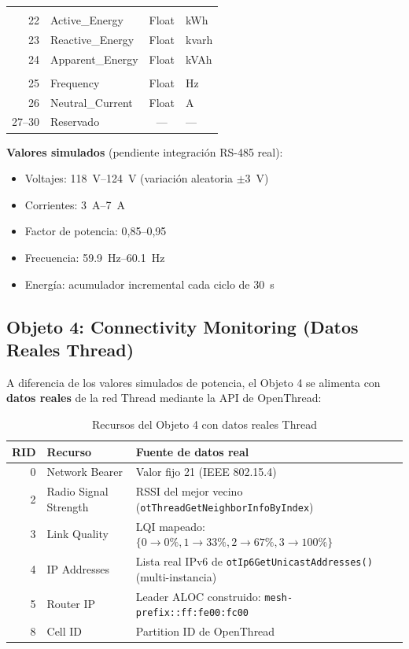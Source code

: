 \documentclass[11pt,a4paper]{article}
\begin{document}
\begin{longtable}{r l c l}
\addlinespace
\multicolumn{4}{l}{\textbf{Energía Acumulada}} \\
22 & Active\_Energy & Float & kWh \\
23 & Reactive\_Energy & Float & kvarh \\
24 & Apparent\_Energy & Float & kVAh \\
\addlinespace
\multicolumn{4}{l}{\textbf{Sistema}} \\
25 & Frequency & Float & Hz \\
26 & Neutral\_Current & Float & A \\
27--30 & Reservado & --- & --- \\
\bottomrule
\end{longtable}

\noindent\textbf{Valores simulados} (pendiente integración RS-485 real):
\begin{itemize}[leftmargin=1.2cm]
    \item Voltajes: \SI{118}{\volt}--\SI{124}{\volt} (variación aleatoria $\pm$\SI{3}{\volt})
    \item Corrientes: \SI{3}{\ampere}--\SI{7}{\ampere}
    \item Factor de potencia: 0,85--0,95
    \item Frecuencia: \SI{59.9}{\hertz}--\SI{60.1}{\hertz}
    \item Energía: acumulador incremental cada ciclo de \SI{30}{\second}
\end{itemize}

\subsection{Objeto 4: Connectivity Monitoring (Datos Reales Thread)}

A diferencia de los valores simulados de potencia, el Objeto 4 se alimenta con \textbf{datos reales} de la red Thread mediante la API de OpenThread:

\begin{table}[H]
\centering
\caption{Recursos del Objeto 4 con datos reales Thread}
\label{tab:obj4}
\begin{tabularx}{\textwidth}{r l X}
\toprule
\textbf{RID} & \textbf{Recurso} & \textbf{Fuente de datos real} \\
\midrule
0 & Network Bearer & Valor fijo 21 (IEEE 802.15.4) \\
2 & Radio Signal Strength & RSSI del mejor vecino (\texttt{otThreadGetNeighborInfoByIndex}) \\
3 & Link Quality & LQI mapeado: $\{0\rightarrow 0\%, 1\rightarrow 33\%, 2\rightarrow 67\%, 3\rightarrow 100\%\}$ \\
4 & IP Addresses & Lista real IPv6 de \texttt{otIp6GetUnicastAddresses()} (multi-instancia) \\
5 & Router IP & Leader ALOC construido: \texttt{mesh-prefix::ff:fe00:fc00} \\
8 & Cell ID & Partition ID de OpenThread \\
\bottomrule
\end{tabularx}
\end{table}
\end{document}

